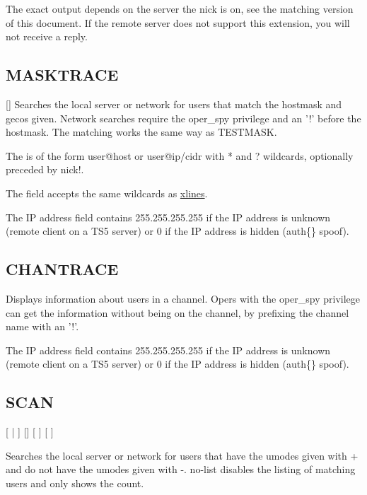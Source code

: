 	The exact output depends on the server the nick is on, see the matching
	version of this document. If the remote server does not support this
	extension, you will not receive a reply.

\subsection{MASKTRACE}

  []
	Searches the local server or network for users that match the hostmask
	and gecos given. Network searches require the oper\_spy privilege and
	an '!' before the hostmask. The matching works the same way as
	TESTMASK.

	The  is of the form user@host or user@ip/cidr with
	* and ? wildcards, optionally preceded by nick!.

	The  field accepts the same wildcards as
	\hyperref[XLINES]{xlines}.

	The IP address field contains 255.255.255.255 if the IP address is
	unknown (remote client on a TS5 server) or 0 if the IP address is
	hidden (auth\{\} spoof).

\subsection{CHANTRACE}

 
	Displays information about users in a channel. Opers with the
	oper\_spy privilege can get the information without being on the
	channel, by prefixing the channel name with an '!'.

	The IP address field contains 255.255.255.255 if the IP address is
	unknown (remote client on a TS5 server) or 0 if the IP address is
	hidden (auth\{\} spoof).

\subsection{SCAN}

	\literal{+}\literal{-}
	[ | ] []
	[ ]
	[ ]

	Searches the local server or network for users that have the umodes
	given with + and do not have the umodes given with -{}.	no-{}list
	disables the listing of matching users and only shows the count.

